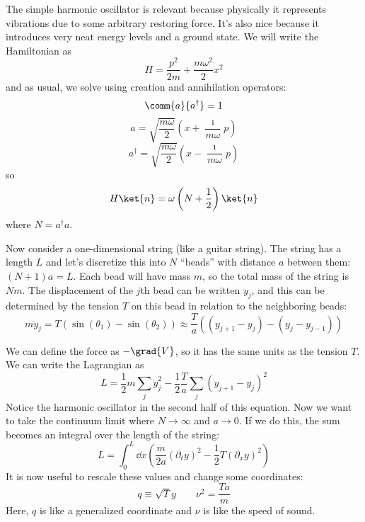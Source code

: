 \documentclass[a4paper,twoside,master.tex]{subfiles}
\begin{document}
The simple harmonic oscillator is relevant because physically it represents vibrations due to some arbitrary restoring force. It's also nice because it introduces very neat energy levels and a ground state. We will write the Hamiltonian as
\begin{equation}
    H = \frac{p^2}{2m} + \frac{m \omega^2}{2} x^2
\end{equation}
and as usual, we solve using creation and annihilation operators:
\begin{equation}
    \comm{a}{a^\dagger} = 1
\end{equation}
\begin{equation}
    a = \sqrt{\frac{m \omega}{2}} \left( x + \frac{\imath}{m \omega} p \right)
\end{equation}
\begin{equation}
    a^\dagger = \sqrt{\frac{m \omega}{2}} \left( x - \frac{\imath}{m \omega} p \right)
\end{equation}
so
\begin{equation}
    H\ket{n} = \omega \left( N + \frac{1}{2} \right)\ket{n}
\end{equation}
where $ N = a^\dagger a $.

Now consider a one-dimensional string (like a guitar string). The string has a length $ L $ and let's discretize this into $ N $ ``beads'' with distance $ a $ between them: $ (N + 1)a = L $. Each bead will have mass $ m $, so the total mass of the string is $ Nm $. The displacement of the $ j $th bead can be written $ y_j $, and this can be determined by the tension $ T $ on this bead in relation to the neighboring beads:
\begin{equation}
    m \ddot{y}_j = T(\sin(\theta_1) - \sin(\theta_2)) \approx \frac{T}{a} ( (y_{j+1} - y_j) - (y_j - y_{j-1}))
\end{equation}

We can define the force as $ - \grad{V} $, so it has the same units as the tension $ T $. We can write the Lagrangian as
\begin{equation}
    L = \frac{1}{2} m \sum_j \dot{y}^2_j - \frac{1}{2} \frac{T}{a} \sum_j (y_{j+1} - y_j)^2
\end{equation}
Notice the harmonic oscillator in the second half of this equation. Now we want to take the continuum limit where $ N \to \infty $ and $ a \to 0 $. If we do this, the sum becomes an integral over the length of the string:
\begin{equation}
    L = \int_0^L \dd{x} \left( \frac{m}{2a} (\partial_t y)^2 - \frac{1}{2} T (\partial_x y)^2 \right)
\end{equation}
It is now useful to rescale these values and change some coordinates:
\begin{equation}
    q \equiv \sqrt{T} y \qquad \nu^2 = \frac{Ta}{m}
\end{equation}
Here, $ q $ is like a generalized coordinate and $ \nu $ is like the speed of sound.
\end{document}
